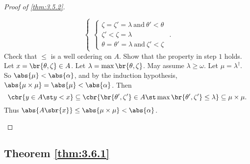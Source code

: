 \begin{proof}[Proof of \ref{thm:3.5.2}]
\begin{enumerate}[leftmargin=0.5in, label=Step \arabic*.]
$$\begin{cases}
\begin{cases}
\zeta = \zeta' = \lambda \ \text{and} \ \theta' < \theta \\
\zeta' < \zeta = \lambda \\
\theta = \theta' = \lambda \ \text{and} \ \zeta' < \zeta
\end{cases}
\end{cases}.
$$
Check that $ \le $ is a well ordering on $ A $. Show that the property in step $ 1 $ holds. Let $ x = \br{\theta, \zeta} \in A $. Let $ \lambda = \max\br{\theta, \zeta} $. May assume $ \lambda \ge \omega $. Let $ \mu = \lambda^\dagger $. So $ \abs{\mu} < \abs{\alpha} $, and by the induction hypothesis, $ \abs{\mu \times \mu} = \abs{\mu} < \abs{\alpha} $. Then
$$ \cbr{y \in A \st y < x} \subseteq \cbr{\br{\theta', \zeta'} \in A \st \max\br{\theta', \zeta'} \le \lambda} \subseteq \mu \times \mu. $$
Thus $ \abs{A\sbr{x}} \le \abs{\mu \times \mu} < \abs{\alpha} $.
\end{enumerate}
\end{proof}

\pagebreak

\subsection{Theorem \ref{thm:3.6.1}}

